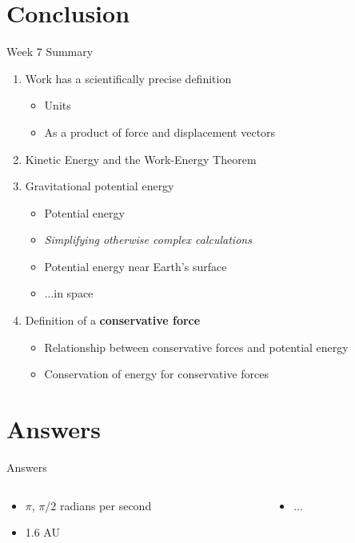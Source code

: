 \documentclass{beamer}
\begin{document}
\section{Conclusion}

\begin{frame}{Week 7 Summary}
\begin{enumerate}
\item \alert{Work} has a scientifically precise definition
\begin{itemize}
\item Units
\item As a product of force and displacement vectors
\end{itemize}
\item Kinetic Energy and the \alert{Work-Energy Theorem}
\item Gravitational potential energy
\begin{itemize}
\item Potential energy
\item \textit{Simplifying otherwise complex calculations}
\item Potential energy near Earth's surface
\item ...in space
\end{itemize}
\item Definition of a \textbf{conservative force}
\begin{itemize}
\item Relationship between conservative forces and potential energy
\item Conservation of energy for conservative forces
\end{itemize}
\end{enumerate}
\end{frame}

\section{Answers}

\begin{frame}{Answers}
\begin{columns}[T]
\begin{column}{0.5\textwidth}
\begin{itemize}
\item $\pi$, $\pi/2$ radians per second
\item 1.6 AU
\end{itemize}
\end{column}
\begin{column}{0.5\textwidth}
\begin{itemize}
\item ... 
\end{itemize}
\end{column}
\end{columns}
\end{frame}
\end{document}
